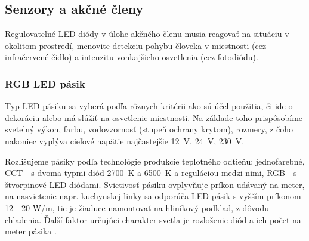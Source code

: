 \documentclass[12pt, a4paper]{article}
\begin{document}
\subsection{Senzory a akčné členy}
Regulovateľné LED diódy v úlohe akčného členu musia reagovať na situáciu v okolitom prostredí, menovite detekciu pohybu človeka v miestnosti (cez infračervené čidlo) a intenzitu vonkajšieho osvetlenia (cez fotodiódu). 

\subsubsection{RGB LED pásik}
Typ LED pásiku sa vyberá podľa rôznych kritérii ako sú účel použitia, či ide o dekoráciu alebo má slúžiť na osvetlenie miestnosti. Na základe toho prispôsobíme svetelný výkon, farbu, vodovzornosť (stupeň ochrany krytom), rozmery, z čoho nakoniec vyplýva cieľové napätie najčastejšie 12~V, 24~V, 230~V. 

Rozlišujeme pásiky podľa technológie produkcie teplotného odtieňu: jednofarebné, CCT - s dvoma typmi diód 2700~K a 6500~K a reguláciou medzi nimi, RGB - s štvorpinové LED diódami. Svietivosť pásiku ovplyvňuje príkon udávaný na meter, na nasvietenie napr. kuchynskej linky sa odporúča LED pásik s vyšším príkonom 12 - 20 W/m, tie je žiaduce namontovať na hliníkový podklad, z dôvodu chladenia. Ďalší faktor určujúci charakter svetla je rozloženie diód a ich počet na meter pásika \cite{123ledsk_ako_nodate}.
\end{document}
